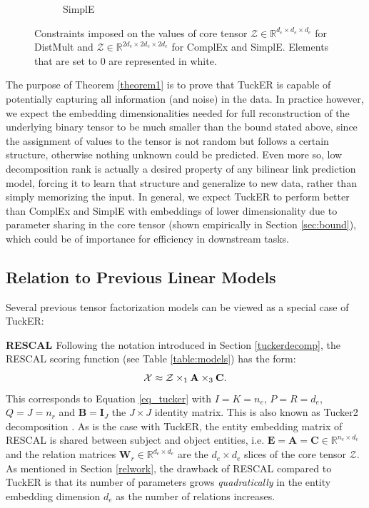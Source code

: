 \documentclass[11pt,a4paper]{article}
\newcommand{\keypoint}[1]{\vspace{0.1cm}\noindent\textbf{#1}\quad}
\begin{document}
\begin{figure}[!ht]
{\begin{subfigure}[b]{0.3\textwidth}
\begin{tikzpicture}
    \end{tikzpicture}
    \caption{SimplE}
    \label{fig:simple}
\end{subfigure}
}
\caption{Constraints imposed on the values of core tensor $\mathcal{Z} \in \mathbb{R}^{d_e \times d_e \times d_e}$ for DistMult and $\mathcal{Z} \in \mathbb{R}^{2d_e \times 2d_e \times 2d_e}$ for ComplEx and SimplE. Elements that are set to 0 are represented in white.}
\label{fig:cubes}
\end{figure}

The purpose of Theorem \ref{theorem1} is to prove that TuckER is capable of potentially capturing all information (and noise) in the data. In practice however, we expect the embedding dimensionalities needed for full reconstruction of the underlying binary tensor to be much smaller than the bound stated above, since the assignment of values to the tensor is not random but follows a certain structure, otherwise nothing unknown could be predicted. Even more so, low decomposition rank is actually a desired property of any bilinear link prediction model, forcing it to learn that structure and generalize to new data, rather than simply memorizing the input. In general, we expect TuckER to perform better than ComplEx and SimplE with embeddings of lower dimensionality due to parameter sharing in the core tensor (shown empirically in Section \ref{sec:bound}), which could be of importance for efficiency in downstream tasks. 


\subsection{Relation to Previous Linear Models}

Several previous tensor factorization models can be viewed as a special case of TuckER:

\keypoint{RESCAL \cite{nickel2011three}} Following the notation introduced in Section \ref{tuckerdecomp}, the RESCAL scoring function (see Table \ref{table:models}) has the form: 
\vspace{-0.2cm}
\begin{equation}
\mathcal{X} \approx \mathcal{Z} \times_1 \mathbf{A} \times_3 \mathbf{C}.
\label{eq_tucker2}
\vspace{-0.2cm}
\end{equation}
This corresponds to Equation \ref{eq_tucker} with $I = K = n_e$, $P = R = d_e$, $Q = J = n_r$ and $\mathbf{B} = \mathbf{I}_J$ the $J \times J$ identity matrix. This is also known as Tucker2 decomposition \cite{kolda2009tensor}. As is the case with TuckER, the entity embedding matrix of RESCAL is shared between subject and object entities, i.e. $\mathbf{E} = \mathbf{A} = \mathbf{C} \in \mathbb{R}^{n_e \times d_e}$ and the relation matrices $\mathbf{W}_r \in \mathbb{R}^{d_e \times d_e}$ are the $d_e \times d_e$ slices of the core tensor $\mathcal{Z}$. As mentioned in Section \ref{relwork}, the drawback of RESCAL compared to TuckER is that its number of parameters grows \emph{quadratically} in the entity embedding dimension $d_e$ as the number of relations increases. 
\end{document}

